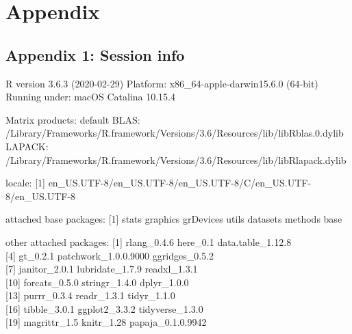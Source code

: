 \documentclass[english,man,man,floatsintext]{apa6}
\begin{document}
\hypertarget{appendix}{%
\section{Appendix}\label{appendix}}

\hypertarget{appendix-1-session-info}{%
\subsection{Appendix 1: Session info}\label{appendix-1-session-info}}

R version 3.6.3 (2020-02-29)
Platform: x86\_64-apple-darwin15.6.0 (64-bit)
Running under: macOS Catalina 10.15.4

Matrix products: default
BLAS: /Library/Frameworks/R.framework/Versions/3.6/Resources/lib/libRblas.0.dylib
LAPACK: /Library/Frameworks/R.framework/Versions/3.6/Resources/lib/libRlapack.dylib

locale:
{[}1{]} en\_US.UTF-8/en\_US.UTF-8/en\_US.UTF-8/C/en\_US.UTF-8/en\_US.UTF-8

attached base packages:
{[}1{]} stats graphics grDevices utils datasets methods base

other attached packages:
{[}1{]} rlang\_0.4.6 here\_0.1 data.table\_1.12.8\\
{[}4{]} gt\_0.2.1 patchwork\_1.0.0.9000 ggridges\_0.5.2\\
{[}7{]} janitor\_2.0.1 lubridate\_1.7.9 readxl\_1.3.1\\
{[}10{]} forcats\_0.5.0 stringr\_1.4.0 dplyr\_1.0.0\\
{[}13{]} purrr\_0.3.4 readr\_1.3.1 tidyr\_1.1.0\\
{[}16{]} tibble\_3.0.1 ggplot2\_3.3.2 tidyverse\_1.3.0\\
{[}19{]} magrittr\_1.5 knitr\_1.28 papaja\_0.1.0.9942
\end{document}
